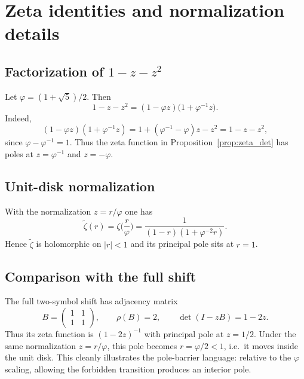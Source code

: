 
\section{Zeta identities and normalization details}
\label{app:zeta_details}

\subsection{Factorization of \texorpdfstring{$1-z-z^2$}{1-z-z2}}
Let $\varphi=(1+\sqrt{5})/2$.
Then
\[
1-z-z^2=(1-\varphi z)\bigl(1+\varphi^{-1}z\bigr).
\]
Indeed,
\[
(1-\varphi z)(1+\varphi^{-1}z)=1+(\varphi^{-1}-\varphi)z-z^2
=1-z-z^2,
\]
since $\varphi-\varphi^{-1}=1$.
Thus the zeta function in Proposition~\ref{prop:zeta_det} has poles at $z=\varphi^{-1}$ and $z=-\varphi$.

\subsection{Unit-disk normalization}
With the normalization $z=r/\varphi$ one has
\[
\widetilde{\zeta}(r)=\zeta\Big(\frac{r}{\varphi}\Big)
=\frac{1}{(1-r)(1+\varphi^{-2}r)}.
\]
Hence $\widetilde{\zeta}$ is holomorphic on $|r|<1$ and its principal pole sits at $r=1$.

\subsection{Comparison with the full shift}
The full two-symbol shift has adjacency matrix
\[
B=\begin{pmatrix}1&1\\1&1\end{pmatrix},
\qquad \rho(B)=2,
\qquad \det(I-zB)=1-2z.
\]
Thus its zeta function is $(1-2z)^{-1}$ with principal pole at $z=1/2$.
Under the same normalization $z=r/\varphi$, this pole becomes $r=\varphi/2<1$, i.e.\ it moves inside the unit disk.
This cleanly illustrates the pole-barrier language: relative to the $\varphi$ scaling, allowing the forbidden transition produces an interior pole.


